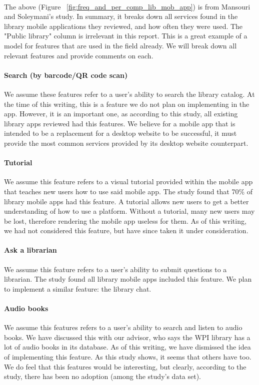     \paragraph{}
    The above (Figure ~\ref{fig:freq_and_per_comp_lib_mob_app}) is from Mansouri and Soleymani's study. In summary, it breaks down all services found in the library mobile applications they reviewed, and how often they were used. The "Public library" column is irrelevant in this report. This is a great example of a model for features that are used in the field already. We will break down all relevant features and provide comments on each.
    \paragraph{Search (by barcode/QR code scan)}
    We assume these features refer to a user's ability to search the library catalog. At the time of this writing, this is a feature we do not plan on implementing in the \appname app. However, it is an important one, as according to this study, all existing library apps reviewed had this features. We believe for a mobile app that is intended to be a replacement for a desktop website to be successful, it must provide the most common services provided by its desktop website counterpart.
    \paragraph{Tutorial}
    We assume this feature refers to a visual tutorial provided within the mobile app that teaches new users how to use said mobile app. The study found that 70\% of library mobile apps had this feature. A tutorial allows new users to get a better understanding of how to use a platform. Without a tutorial, many new users may be lost, therefore rendering the mobile app useless for them. As of this writing, we had not considered this feature, but have since taken it under consideration.
    \paragraph{Ask a librarian}
    We assume this feature refers to a user's ability to submit questions to a librarian. The study found all library mobile apps included this feature. We plan to implement a similar feature: the library chat.
    \paragraph{Audio books}
    We assume this features refers to a user's ability to search and listen to audio books. We have discussed this with our advisor, who says the WPI library has a lot of audio books in its database. As of this writing, we have dismissed the idea of implementing this feature. As this study shows, it seems that others have too. We do feel that this features would be interesting, but clearly, according to the study, there has been no adoption (among the study's data set).
